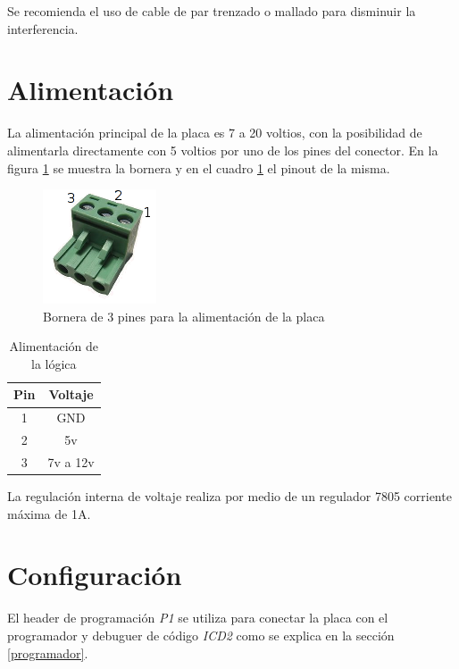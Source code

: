 \documentclass[a4paper,10pt]{article}
\begin{document}
Se recomienda el uso de cable de par trenzado o mallado para disminuir la interferencia.

\section{Alimentaci\'on}
\label{alimentacion}

La alimentaci\'on principal de la placa es 7 a 20 voltios, con la posibilidad de alimentarla directamente 
con 5 voltios por uno de los pines del conector. 
En la figura \ref{borneras} se muestra la bornera y en el cuadro \ref{alimentacionLogica} el pinout de la misma.

\begin{figure}
\centering
\includegraphics[scale=.5]{bornera3.png}
\caption{Bornera de 3 pines para la alimentaci\'on de la placa}
\label{borneras}
\end{figure}

\begin{table}
\begin{center}
\begin{tabular}{|c|c|}
\hline
Pin & Voltaje \\
\hline
1 & GND \\
\hline
2 & 5v \\
\hline
3 & 7v a 12v \\
\hline
\end{tabular}
\caption{Alimentaci\'on de la l\'ogica}
\label{alimentacionLogica}
\end{center}
\end{table}

La regulaci\'on interna de voltaje realiza por medio de un regulador 7805 corriente m\'axima de 1A.

\section{Configuraci\'on}
\label{configuracion}

El header de programaci\'on \emph{P1} se utiliza para conectar la placa con el programador y debuguer de c\'odigo \emph{ICD2} como se explica en la secci\'on \ref{programador}.
\end{document}
